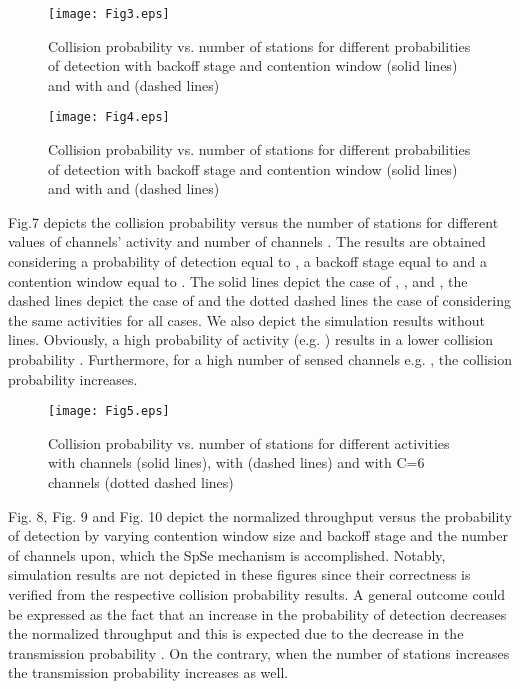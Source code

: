 \documentclass
[journal,11pt,draftclsnofoot,onecolumn,doublespace]{tETN2e}
\begin{document}
\begin{figure}
\centering
  \texttt{[image: Fig3.eps]}\\
  \caption{Collision probability  vs. number of stations  for different probabilities of detection  with backoff stage  and contention window  (solid lines) and with  and  (dashed lines)}
  \label{fig:3}
\end{figure}

\begin{figure}
\centering
  \texttt{[image: Fig4.eps]}\\
  \caption{Collision probability  vs. number of stations  for different probabilities of detection  with backoff stage  and contention window  (solid lines) and with  and  (dashed lines)}
  \label{fig:4}
\end{figure}

Fig.7 depicts the collision probability  versus the number of stations  for different values of channels’ activity  and number of channels . The results are obtained considering a probability of detection equal to , a backoff stage equal to  and a contention window equal to . The solid lines depict the case of , ,  and , the dashed lines depict the case of  and the dotted dashed lines the case of  considering the same activities for all cases. We also depict the simulation results without lines. Obviously, a high probability of activity (e.g. ) results in a lower collision probability . Furthermore, for a high number of sensed channels e.g. , the collision probability  increases.

\begin{figure}
\centering
  \texttt{[image: Fig5.eps]}\\
  \caption{Collision probability  vs. number of stations  for different activities  with  channels (solid lines), with  (dashed lines) and with C=6 channels (dotted dashed lines)}
  \label{fig:5}
\end{figure}

Fig. 8, Fig. 9 and Fig. 10 depict the normalized throughput  versus the probability of detection  by varying contention window size  and backoff stage  and the number of channels upon, which the SpSe mechanism is accomplished. Notably, simulation results are not depicted in these figures since their correctness is verified from the respective collision probability results. A general outcome could be expressed as the fact that an increase in the probability of detection  decreases the normalized throughput  and this is expected due to the decrease in the transmission probability . On the contrary, when the number of stations  increases the transmission probability  increases as well. 
\end{document}
